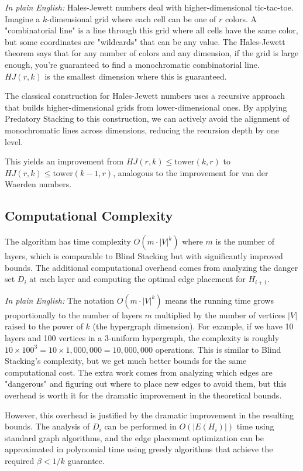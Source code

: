 \documentclass[12pt]{article}
\begin{document}
\textit{In plain English:} Hales-Jewett numbers deal with higher-dimensional tic-tac-toe. Imagine a $k$-dimensional grid where each cell can be one of $r$ colors. A "combinatorial line" is a line through this grid where all cells have the same color, but some coordinates are "wildcards" that can be any value. The Hales-Jewett theorem says that for any number of colors and any dimension, if the grid is large enough, you're guaranteed to find a monochromatic combinatorial line. $HJ(r,k)$ is the smallest dimension where this is guaranteed.

The classical construction for Hales-Jewett numbers uses a recursive approach that builds higher-dimensional grids from lower-dimensional ones. By applying Predatory Stacking to this construction, we can actively avoid the alignment of monochromatic lines across dimensions, reducing the recursion depth by one level.

This yields an improvement from $HJ(r,k) \leq \text{tower}(k,r)$ to $HJ(r,k) \leq \text{tower}(k-1,r)$, analogous to the improvement for van der Waerden numbers.

\subsection{Computational Complexity}
The algorithm has time complexity $O(m \cdot |V|^k)$ where $m$ is the number of layers, which is comparable to Blind Stacking but with significantly improved bounds. The additional computational overhead comes from analyzing the danger set $D_i$ at each layer and computing the optimal edge placement for $H_{i+1}$.

\textit{In plain English:} The notation $O(m \cdot |V|^k)$ means the running time grows proportionally to the number of layers $m$ multiplied by the number of vertices $|V|$ raised to the power of $k$ (the hypergraph dimension). For example, if we have 10 layers and 100 vertices in a 3-uniform hypergraph, the complexity is roughly $10 \times 100^3 = 10 \times 1,000,000 = 10,000,000$ operations. This is similar to Blind Stacking's complexity, but we get much better bounds for the same computational cost. The extra work comes from analyzing which edges are "dangerous" and figuring out where to place new edges to avoid them, but this overhead is worth it for the dramatic improvement in the theoretical bounds.

However, this overhead is justified by the dramatic improvement in the resulting bounds. The analysis of $D_i$ can be performed in $O(|E(H_i)|)$ time using standard graph algorithms, and the edge placement optimization can be approximated in polynomial time using greedy algorithms that achieve the required $\beta < 1/k$ guarantee.
\end{document}
